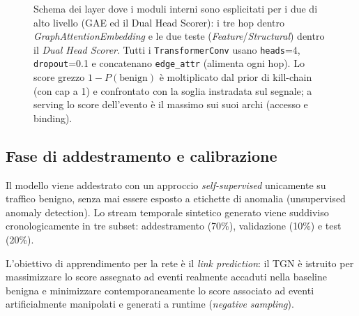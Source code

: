 \documentclass[11pt,a4paper]{report}
\begin{document}
\begin{figure}
\caption{Schema dei layer dove i moduli interni sono esplicitati per i due di alto livello (GAE ed il Dual Head Scorer): i tre hop dentro \textit{GraphAttentionEmbedding} e le due teste (\textit{Feature}/\textit{Structural}) dentro il \textit{Dual Head Scorer}. Tutti i \texttt{TransformerConv} usano \texttt{heads}=4, \texttt{dropout}=0.1 e concatenano \texttt{edge\_attr} (alimenta ogni hop). Lo score grezzo $1-P(\text{benign})$ è moltiplicato dal prior di kill-chain (con cap a 1) e confrontato con la soglia instradata sul segnale; a serving lo score dell'evento è il massimo sui suoi archi (accesso e binding).}
\label{fig:layers}
\end{figure}


\subsection{Fase di addestramento e calibrazione}

Il modello viene addestrato con un approccio \textit{self-supervised} unicamente su traffico benigno, senza mai essere esposto a etichette di anomalia (unsupervised anomaly detection). Lo stream temporale sintetico generato viene suddiviso cronologicamente in tre subset: addestramento (70\%), validazione (10\%) e test (20\%).

L'obiettivo di apprendimento per la rete è il \textit{link prediction}: il TGN è istruito per massimizzare lo score assegnato ad eventi realmente accaduti nella baseline benigna e minimizzare contemporaneamente lo score associato ad eventi artificialmente manipolati e generati a runtime (\textit{negative sampling}).
\end{document}
